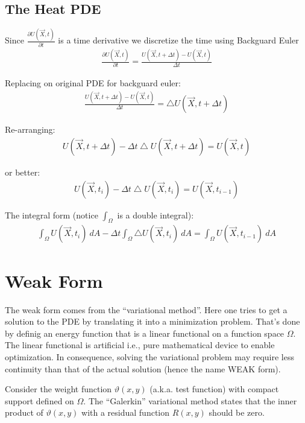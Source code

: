 \documentclass{birkjour}
\numberwithin{equation}{section}
\begin{document}
\subsection{The Heat PDE}

Since $\frac{ \partial U(\vec X, t)}{\partial t}$ is a time derivative we discretize the time using Backguard Euler
\begin{eqnarray}
	\frac{ \partial U(\vec X, t)}{\partial t} = \frac{U(\vec X, t + \Delta t) - U(\vec X, t)}{\Delta t}
\end{eqnarray}

Replacing on original PDE for backguard euler:
\begin{eqnarray}
	\frac{U(\vec X, t + \Delta t) - U(\vec X, t)}{\Delta t} = \bigtriangleup U(\vec X, t + \Delta t)
\end{eqnarray}

Re-arranging:
\begin{eqnarray}
 	U(\vec X, t + \Delta t) - \Delta t  \bigtriangleup U(\vec X, t + \Delta t) = U(\vec X, t)
\end{eqnarray}

or better:
\begin{eqnarray} 
	U(\vec X, t_i) - \Delta t \bigtriangleup U(\vec X, t_i) = U(\vec X, t_{i-1})
\end{eqnarray}

The integral form (notice $\int_{\Omega}$ is a double integral):
\begin{eqnarray} 
	\int_{\Omega}{ U(\vec X, t_i) \ dA} - \Delta t \int_{\Omega}{ \bigtriangleup U(\vec X, t_i) \ dA } = \int_{\Omega} { U(\vec X, t_{i-1}) \ dA }
\end{eqnarray}

\section{Weak Form}

The weak form comes from the ``variational method''. Here one tries to get a solution to the 
PDE by translating it into a minimization problem. That's done by definig an energy function that is a 
linear functional on a function space $\Omega$. The linear functional is artificial i.e., pure 
mathematical device to enable optimization. In consequence, solving the variational problem may 
require less continuity than that of the actual solution (hence the name WEAK form).
 
Consider the weight function $\vartheta (x,y)$ (a.k.a. test function) with compact support defined on $\Omega$.
The ``Galerkin'' variational method states that the inner product of $\vartheta(x,y)$ with a residual function $R(x,y)$ should be zero.
\end{document}
